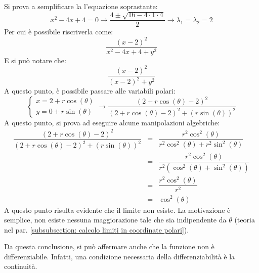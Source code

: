 \documentclass[a4paper]{article}
\begin{document}
	\noindent
	Si prova a semplificare la l'equazione soprastante:
	\begin{equation*}
		x^{2}-4x+4 = 0 \rightarrow \dfrac{4 \pm \sqrt{16 - 4 \cdot 1 \cdot 4}}{2} \rightarrow \lambda_{1}=\lambda_{2}=2
	\end{equation*}
	Per cui è possibile riscriverla come:
	\begin{equation*}
		\dfrac{\left(x-2\right)^{2}}{x^{2}-4x +4 +y^{2}}
	\end{equation*}
	E si può notare che:
	\begin{equation*}
		\dfrac{\left(x-2\right)^{2}}{\left(x-2\right)^{2} +y^{2}}
	\end{equation*}
	A questo punto, è possibile passare alle variabili polari:
	\begin{equation*}
		\begin{cases}
			x = 2 + r\cos\left(\theta\right) \\
			y = 0 + r\sin\left(\theta\right)
		\end{cases}
		\rightarrow
		\dfrac{\left(2 + r\cos\left(\theta\right)-2\right)^{2}}{\left(2 + r\cos\left(\theta\right)-2\right)^{2} +\left(r\sin\left(\theta\right)\right)^{2}}
	\end{equation*}
	A questo punto, si prova ad eseguire alcune manipolazioni algebriche:
	\begin{equation*}
		\begin{array}{rcl}
			\dfrac{\left(2 + r\cos\left(\theta\right)-2\right)^{2}}{\left(2 + r\cos\left(\theta\right)-2\right)^{2} +\left(r\sin\left(\theta\right)\right)^{2}}
			&=&
			\dfrac{r^{2}\cos^{2}\left(\theta\right)}{r^{2}\cos^{2}\left(\theta\right) + r^{2}\sin^{2}\left(\theta\right)} \\ [1.5em]
			&=& \dfrac{r^{2}\cos^{2}\left(\theta\right)}{r^{2}\left(\cos^{2}\left(\theta\right) + \sin^{2}\left(\theta\right)\right)} \\ [1.5em]
			&=& \dfrac{r^{2}\cos^{2}\left(\theta\right)}{r^{2}} \\ [1.5em]
			&=& \cos^{2}\left(\theta\right)
		\end{array}
	\end{equation*}
	A questo punto risulta evidente che il limite non esiste. La motivazione è semplice, non esiste nessuna maggiorazione tale che sia indipendente da $\theta$ (teoria nel par. \ref{subsubsection: calcolo limiti in coordinate polari}).

	Da questa conclusione, si può affermare anche che la funzione non è differenziabile. Infatti, una condizione necessaria della differenziabilità è la continuità.\newpage
\end{document}
